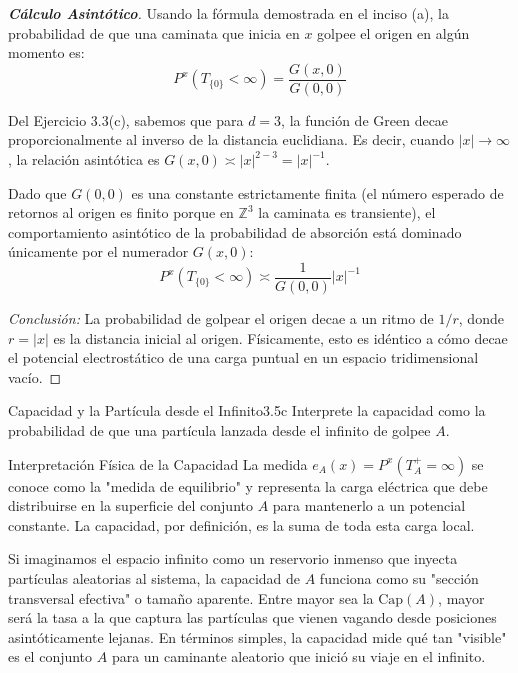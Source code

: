 \documentclass[10pt,a4paper]{article}
\begin{document}
\begin{proof}[\textbf{Cálculo Asintótico}]
    Usando la fórmula demostrada en el inciso (a), la probabilidad de que una caminata que inicia en $x$ golpee el origen en algún momento es:
    $$P^x(T_{\{0\}} < \infty) = \frac{G(x, 0)}{G(0, 0)}$$
    
    Del Ejercicio 3.3(c), sabemos que para $d=3$, la función de Green decae proporcionalmente al inverso de la distancia euclidiana. Es decir, cuando $|x| \to \infty$, la relación asintótica es $G(x,0) \asymp |x|^{2-3} = |x|^{-1}$.
    
    Dado que $G(0,0)$ es una constante estrictamente finita (el número esperado de retornos al origen es finito porque en $\mathbb{Z}^3$ la caminata es transiente), el comportamiento asintótico de la probabilidad de absorción está dominado únicamente por el numerador $G(x,0)$:
    $$P^x(T_{\{0\}} < \infty) \asymp \frac{1}{G(0,0)} |x|^{-1}$$
    
    \textit{Conclusión:} La probabilidad de golpear el origen decae a un ritmo de $1/r$, donde $r = |x|$ es la distancia inicial al origen. Físicamente, esto es idéntico a cómo decae el potencial electrostático de una carga puntual en un espacio tridimensional vacío.
\end{proof}

\newpage

\begin{ejercicio}{Capacidad y la Partícula desde el Infinito}{3.5c}
    Interprete la capacidad como la probabilidad de que una partícula lanzada desde el infinito de golpee $A$.
\end{ejercicio}

\begin{nota}{Interpretación Física de la Capacidad}
    La medida $e_A(x) = P^x(T_A^+ = \infty)$ se conoce como la "medida de equilibrio" y representa la carga eléctrica que debe distribuirse en la superficie del conjunto $A$ para mantenerlo a un potencial constante. La capacidad, por definición, es la suma de toda esta carga local.
    
    Si imaginamos el espacio infinito como un reservorio inmenso que inyecta partículas aleatorias al sistema, la capacidad de $A$ funciona como su "sección transversal efectiva" o tamaño aparente. Entre mayor sea la $\text{Cap}(A)$, mayor será la tasa a la que captura las partículas que vienen vagando desde posiciones asintóticamente lejanas. En términos simples, la capacidad mide qué tan "visible" es el conjunto $A$ para un caminante aleatorio que inició su viaje en el infinito.
\end{nota}
\end{document}
